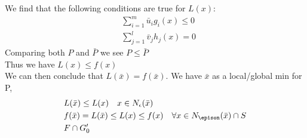\documentclass[12pt]{article}
\begin{document}
We find that the following conditions are true for $L(x)$: \\
    \begin{align*}
        &\sum_{i=1}^{m} \bar u_i g_i(x) \leq 0 \\
        &\sum_{j=1}^{l} \bar v_j h_j(x) = 0
    \end{align*}
Comparing both $P$ and $\bar P$ we see $P \leq  \bar P$\\
Thus we have $L(x) \leq f(x)$\\
We can then conclude that $L(\bar x) = f(\bar x)$. We have $\bar x$ as a local/global min for P,\\
    \begin{align*}
        &L(\bar x) \leq L(x) \quad x \in N_\epsilon (\bar x)\\
        &f(\bar x) = L(\bar x) \leq L(x) \leq f(x) \quad \forall x \in N_\epison (\bar x) \cap S\\
        &F \cap G_0'
    \end{align*}
\end{document}
